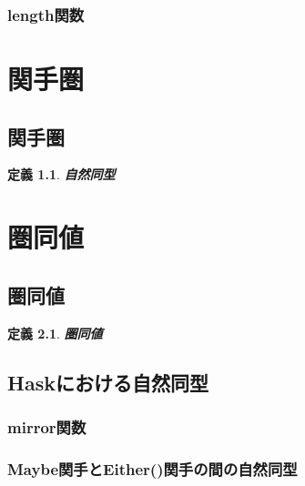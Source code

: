 \documentclass{jsbook}
\theoremstyle{plain}
\newtheorem{Def}{定義}[chapter]
\begin{document}
\subsection{length関数}

\chapter{関手圏}
\section{関手圏}
\begin{Def}
\bf{自然同型}
\end{Def}
\chapter{圏同値}
\section{圏同値}
\begin{Def}
\bf{圏同値}
\end{Def}

\section{Haskにおける自然同型}
\subsection{mirror関数}
\subsection{Maybe関手とEither()関手の間の自然同型}

\printindex
\end{document}
